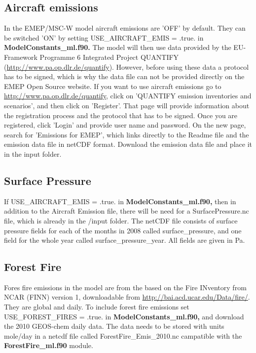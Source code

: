 \subsection{Aircraft emissions}
In the EMEP/MSC-W model aircraft emissions are 'OFF' by default. 
They can be switched 'ON' by setting USE\_AIRCRAFT\_EMIS = .true. in { \bf ModelConstants\_ml.f90.} 
The model will then use data provided by the EU-Framework Programme 6 Integrated 
Project QUANTIFY (\url{http://www.pa.op.dlr.de/quantify}). However, before using 
these data a protocol has to be signed, which is why the data file can not be provided 
directly on the EMEP Open Source website. If you want to use aircraft emissions go to 
\url{http://www.pa.op.dlr.de/quantify}, click on 'QUANTIFY emission inventories and scenarios', 
and then click on 'Register'. That page will provide information about the registration 
process and the protocol that has to be signed. Once you are registered, click 'Login' and 
provide user name and password. On the new page, search for 'Emissions for EMEP', which 
links directly to the Readme file and the emission data file in netCDF format. Download the 
emission data file and place it in the input folder.

\subsection{Surface Pressure}

If USE\_AIRCRAFT\_EMIS = .true. in { \bf ModelConstants\_ml.f90,} then in addition to the Aircraft 
Emission file, there will be need for a SurfacePressure.nc file, which is already in the /input folder. 
The netCDF file consists of surface pressure fields for each of the months in 2008 called surface\_pressure, 
and one field for the whole year called surface\_pressure\_year. All fields are given in Pa. 

\subsection{Forest Fire}
Fores fire emissions in the model are from the based on the Fire INventory from NCAR (FINN) version 1, downloadable 
from \url{http://bai.acd.ucar.edu/Data/fire/}. They are global and daily. To include forest fire emissions set 
USE\_FOREST\_FIRES = .true. in { \bf ModelConstants\_ml.f90,} and download the 
2010 GEOS-chem daily data. The data needs to be stored with units mole/day in a netcdf file called ForestFire\_Emis\_2010.nc 
campatible with the { \bf ForestFire\_ml.f90 } module. 


